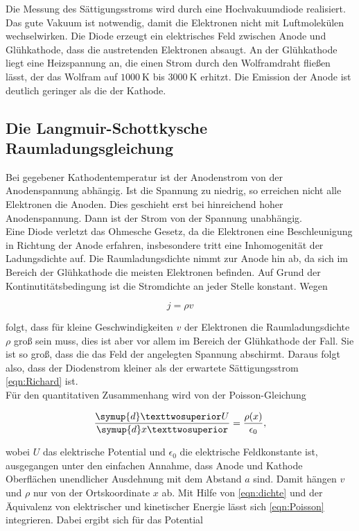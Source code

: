 Die Messung des Sättigungsstroms wird durch eine Hochvakuumdiode realisiert. Das
gute Vakuum ist notwendig, damit die Elektronen nicht mit Luftmolekülen wechselwirken.
Die Diode erzeugt ein elektrisches Feld zwischen Anode und Glühkathode, dass die
austretenden Elektronen absaugt. An der Glühkathode liegt eine Heizspannung an, die
einen Strom durch den Wolframdraht fließen lässt, der das Wolfram auf $\SI{1000}{\kelvin}$
bis $\SI{3000}{\kelvin}$ erhitzt. Die Emission der Anode ist deutlich geringer
als die der Kathode. 

\subsection{Die Langmuir-Schottkysche Raumladungsgleichung}

Bei gegebener Kathodentemperatur ist der Anodenstrom von der Anodenspannung 
abhängig. Ist die Spannung zu niedrig, so erreichen nicht alle Elektronen
die Anoden. Dies geschieht erst bei hinreichend hoher Anodenspannung. Dann ist 
der Strom von der Spannung unabhängig. \\
Eine Diode verletzt das Ohmesche Gesetz, da die Elektronen eine Beschleunigung 
in Richtung der Anode erfahren, insbesondere tritt eine Inhomogenität der 
Ladungsdichte auf. Die Raumladungsdichte nimmt zur Anode hin ab, da sich im 
Bereich der Glühkathode die meisten Elektronen befinden. Auf Grund der 
Kontinutitätsbedingung ist die Stromdichte an jeder Stelle konstant. Wegen

\begin{equation}
j = \rho v
\label{eqn:dichte}
\end{equation}

folgt, dass für kleine Geschwindigkeiten $v$ der Elektronen die Raumladungsdichte
$\rho$ groß sein muss, dies ist aber vor allem im Bereich der Glühkathode der Fall.
Sie ist so groß, dass die das Feld der angelegten Spannung abschirmt. Daraus 
folgt also, dass der Diodenstrom kleiner als der erwartete Sättigungsstrom 
\eqref{eqn:Richard} ist. \\
Für den quantitativen Zusammenhang wird von der Poisson-Gleichung 

\begin{equation}
\frac{\symup{d}²U}{\symup{d}x²} = \frac{\rho(x)}{\epsilon_0},
\label{eqn:Poisson}
\end{equation}

wobei $U$ das elektrische Potential und $\epsilon_0$ die elektrische 
Feldkonstante ist, ausgegangen unter den einfachen Annahme, dass Anode und
Kathode Oberflächen unendlicher Ausdehnung mit dem Abstand $a$ sind. Damit 
hängen $v$ und $\rho$ nur von der Ortskoordinate $x$ ab. Mit Hilfe von 
\eqref{eqn:dichte} und der Äquivalenz von elektrischer und kinetischer 
Energie lässt sich \eqref{eqn:Poisson} integrieren. Dabei ergibt sich 
für das Potential 

